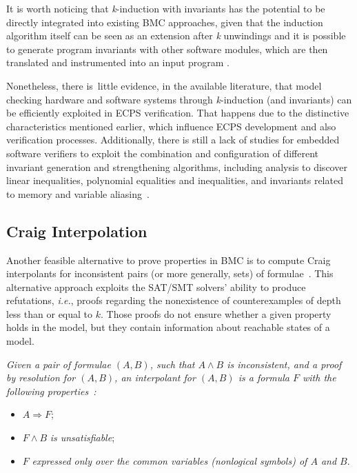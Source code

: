 \documentclass[format=acmsmall, review=false, screen=true]{acmart}
\begin{document}
It is worth noticing that \textit{k}-induction with invariants has the potential to be directly integrated into existing BMC approaches, given that the induction algorithm itself can be seen as an extension after \textit{k} unwindings and it is possible to generate program invariants with other software modules, which are then translated and instrumented into an input program \cite{Rocha15}.

Nonetheless, there is~little evidence, in the available literature, that model checking hardware and software systems through \textit{k}-induction (and invariants) can be efficiently exploited in ECPS verification. That happens due to the distinctive characteristics mentioned earlier, which influence ECPS development and also verification processes. Additionally, there is still a lack of studies for embedded software verifiers to exploit the combination and configuration of different invariant generation and strengthening algorithms, including analysis to discover linear inequalities, polynomial equalities and inequalities, and invariants related to memory and variable aliasing~\cite{Bradley07}.

\subsection{Craig Interpolation}
\label{sec:CraigInterpolationInModelChecking}

Another feasible alternative to prove properties in BMC is to compute Craig interpolants for inconsistent pairs (or more generally, sets) of formulae~\cite{McMillan03,McMillan05,McMillan06,McMillan07}. This alternative approach exploits the SAT/SMT solvers' ability to produce refutations, {\it i.e.}, proofs regarding the nonexistence of counterexamples of depth less than or equal to $k$. Those proofs do not ensure whether a given property holds in the model, but they contain information about reachable states of a model.

\begin{definition}\label{interpolants}
\textit{Given a pair of formulae $\left(A,B\right)$, such that $A \wedge B$ is inconsistent, and a proof by resolution for $\left(A,B\right)$, an \textit{interpolant} for $\left(A,B\right)$ is a formula $F$ with the following properties~\cite{McMillan03,McMillan05}: }

\begin{itemize}
	\item $A \Rightarrow F$;
	\item $F \wedge B$ \textit{is unsatisfiable};
	\item $F$ \textit{expressed only over the common variables (nonlogical symbols) of $A$ and $B$}.
\end{itemize}
\end{definition}
\end{document}
